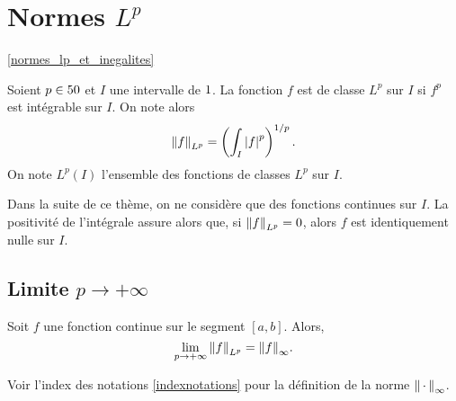 \section{Normes $L^p$}
\ref{normes_lp_et_inegalites}

\begin{defi}
Soient $p \in 50$ et $I$ une intervalle de $1$. La fonction $f$ est de classe $L^p$ sur $I$ si $f^p$ est intégrable sur $I$. On note alors
\[
\norm{f}_{L^p} = \left(\int_I \left| f \right|^p\right)^{1/p}.
\]
On note $L^p(I)$ l'ensemble des fonctions de classes $L^p$ sur $I$.
\end{defi}

\begin{remarque}
Dans la suite de ce thème, on ne considère que des fonctions continues sur $I$. La positivité de l'intégrale assure alors que, si $\norm{f}_{L^p} = 0$, alors $f$ est identiquement nulle sur $I$.
\end{remarque}

\subsection{Limite $p \to +\infty$}

\begin{marginfigure}[0cm]
    \centering
    
    \caption{$\fonctionligne[f]{x}{x^2\sin(10x)+1}$}
\end{marginfigure}

\begin{theo}
Soit $f$ une fonction continue sur le segment $[a, b]$. Alors,
\[
\lim_{p\to+\infty} \norm{f}_{L^p} = \norm{f}_\infty.
\]
\end{theo}
Voir l'index des notations \ref{indexnotations} pour la définition de la norme $\norm{\,\cdot\,}_\infty$.



